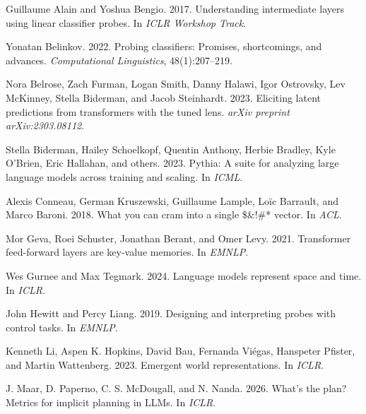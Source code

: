\documentclass[11pt]{article}
\begin{document}
\begin{thebibliography}{}

Guillaume Alain and Yoshua Bengio. 2017.
\newblock Understanding intermediate layers using linear classifier probes.
\newblock In \emph{ICLR Workshop Track}.

Yonatan Belinkov. 2022.
\newblock Probing classifiers: Promises, shortcomings, and advances.
\newblock \emph{Computational Linguistics}, 48(1):207--219.

Nora Belrose, Zach Furman, Logan Smith, Danny Halawi, Igor Ostrovsky, Lev
McKinney, Stella Biderman, and Jacob Steinhardt. 2023.
\newblock Eliciting latent predictions from transformers with the tuned lens.
\newblock \emph{arXiv preprint arXiv:2303.08112}.

Stella Biderman, Hailey Schoelkopf, Quentin Anthony, Herbie Bradley, Kyle
O'Brien, Eric Hallahan, and others. 2023.
\newblock Pythia: A suite for analyzing large language models across training and
scaling.
\newblock In \emph{ICML}.

Alexis Conneau, German Kruszewski, Guillaume Lample, Lo\"{i}c Barrault, and
Marco Baroni. 2018.
\newblock What you can cram into a single \$\&!\#* vector.
\newblock In \emph{ACL}.

Mor Geva, Roei Schuster, Jonathan Berant, and Omer Levy. 2021.
\newblock Transformer feed-forward layers are key-value memories.
\newblock In \emph{EMNLP}.

Wes Gurnee and Max Tegmark. 2024.
\newblock Language models represent space and time.
\newblock In \emph{ICLR}.

John Hewitt and Percy Liang. 2019.
\newblock Designing and interpreting probes with control tasks.
\newblock In \emph{EMNLP}.

Kenneth Li, Aspen K. Hopkins, David Bau, Fernanda Vi\'{e}gas, Hanspeter Pfister,
and Martin Wattenberg. 2023.
\newblock Emergent world representations.
\newblock In \emph{ICLR}.

J. Maar, D. Paperno, C. S. McDougall, and N. Nanda. 2026.
\newblock What's the plan? Metrics for implicit planning in LLMs.
\newblock In \emph{ICLR}.


\end{thebibliography}
\end{document}
